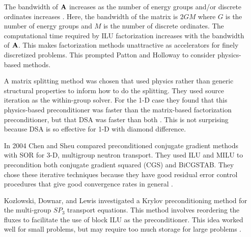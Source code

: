 The bandwidth of $\mathbf{A}$ increases as the number of energy groups and/or discrete ordinates increases \cite{Patton2002}. Here, the bandwidth of the matrix is $2GM$ where $G$ is the number of energy groups and $M$ is the number of discrete ordinates. The computational time required by ILU factorization increases with the bandwidth of $\mathbf{A}$. This makes factorization methods unattractive as accelerators for finely discretized problems. This prompted Patton and Holloway to consider physics-based methods. 

A matrix splitting method was chosen that used physics rather than generic structural properties to inform how to do the splitting. They used source iteration as the within-group solver. For the 1-D case they found that this physics-based preconditioner was faster than the matrix-based factorization preconditioner, but that DSA was faster than both \cite{Patton2002}. This is not surprising because DSA is so effective for 1-D with diamond difference. 

In 2004 Chen and Sheu compared preconditioned conjugate gradient methods with SOR for 3-D, multigroup neutron transport. They used ILU and MILU to precondition both conjugate gradient squared (CGS) and BiCGSTAB. They chose these iterative techniques because they have good residual error control procedures that give good convergence rates in general \cite{Chen2004}.

Kozlowski, Downar, and Lewis investigated a Krylov preconditioning method for the multi-group $SP_3$ transport equations. This method involves reordering the fluxes to facilitate the use of block ILU as the preconditioner. This idea worked well for small problems, but may require too much storage for large problems \cite{Kozlowski2003}.

